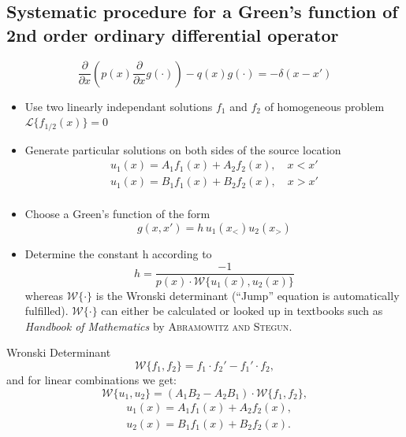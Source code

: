 \subsection{Systematic procedure for a Green's function of 2nd order ordinary differential operator}
\begin{equation*}
  \dfrac{\partial}{\partial x}\left(p(x) \dfrac{\partial}{\partial x} g(\cdot)\right) - q(x)g(\cdot) = -\delta(x-x')
\end{equation*}
\begin{itemize}
  \item Use two linearly independant solutions $f_1$ and $f_2$ of homogeneous problem \(\mathcal{L}\{f_{1/2}(x)\} = 0\)
  \item Generate particular solutions on both sides of the source location
        \begin{align*}
          u_{1}(x) = A_{1} f_{1}(x) + A_{2} f_{2}(x), \quad x < x'\\
          u_{1}(x) = B_{1} f_{1}(x) + B_{2} f_{2}(x), \quad x > x'\\
        \end{align*}
  \item Choose a Green's function of the form
        \begin{equation*}
          g(x, x') = h \, u_{1}(x_{<})u_{2}(x_{>})
        \end{equation*}
  \item Determine the constant h according to
        \begin{equation*}
          h = \dfrac{-1}{p(x) \cdot \mathcal{W}\{u_{1}(x), u_{2}(x)\}}
        \end{equation*}
        whereas $\mathcal{W}\{\cdot\}$ is the Wronski determinant (``Jump'' equation is automatically fulfilled). $\mathcal{W}\{\cdot\}$ can either be calculated or looked up in textbooks such as \textit{Handbook of Mathematics} by \textsc{Abramowitz and Stegun}.
\end{itemize}

\begin{definition}{Wronski Determinant}
  \begin{equation*}
    \mathcal{W}\{f_{1}, f_{2}\} = f_{1}\cdot f_{2}' - f_{1}'\cdot f_{2},
  \end{equation*}
  and for linear combinations we get:
  \begin{equation*}
    \mathcal{W}\{u_{1}, u_{2}\} = (A_{1}B_{2} - A_{2}B_{1}) \cdot \mathcal{W}\{f_{1}, f_{2}\},
  \end{equation*}
  \begin{align*}
    &u_{1}(x) = A_{1}f_{1}(x) + A_{2}f_{2}(x),\\
    &u_{2}(x) = B_{1}f_{1}(x) + B_{2}f_{2}(x).
  \end{align*}
\end{definition}

